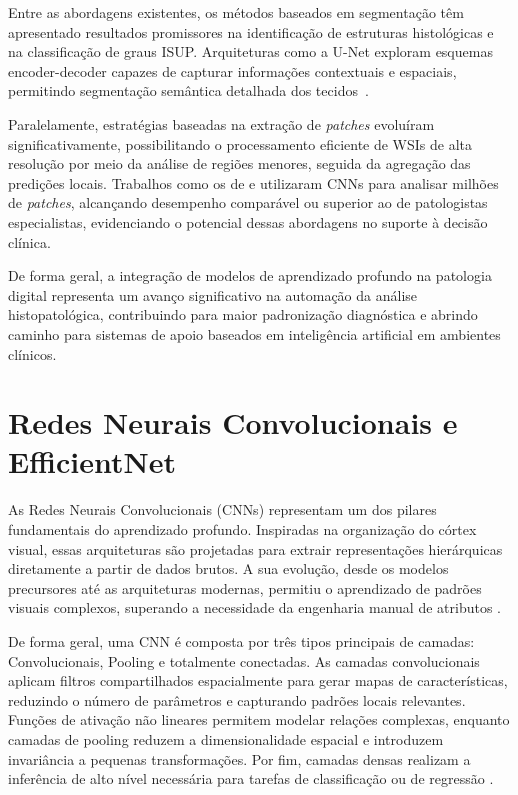 Entre as abordagens existentes, os métodos baseados em segmentação têm apresentado resultados promissores na identificação de estruturas histológicas e na classificação de graus ISUP. Arquiteturas como a U-Net exploram esquemas encoder-decoder capazes de capturar informações contextuais e espaciais, permitindo segmentação semântica detalhada dos tecidos~\cite{ref-bulten2020,ref-singhal2022}.

Paralelamente, estratégias baseadas na extração de \textit{patches} evoluíram significativamente, possibilitando o processamento eficiente de WSIs de alta resolução por meio da análise de regiões menores, seguida da agregação das predições locais. Trabalhos como os de \cite{ref-nagpal2019} e \cite{ref-kott2019} utilizaram CNNs para analisar milhões de \textit{patches}, alcançando desempenho comparável ou superior ao de patologistas especialistas, evidenciando o potencial dessas abordagens no suporte à decisão clínica.

De forma geral, a integração de modelos de aprendizado profundo na patologia digital representa um avanço significativo na automação da análise histopatológica, contribuindo para maior padronização diagnóstica e abrindo caminho para sistemas de apoio baseados em inteligência artificial em ambientes clínicos.


\section{Redes Neurais Convolucionais e EfficientNet}

As Redes Neurais Convolucionais (CNNs) representam um dos pilares fundamentais do aprendizado profundo. Inspiradas na organização do córtex visual, essas arquiteturas são projetadas para extrair representações hierárquicas diretamente a partir de dados brutos. A sua evolução, desde os modelos precursores até as arquiteturas modernas, permitiu o aprendizado de padrões visuais complexos, superando a necessidade da engenharia manual de atributos \cite{recentcnn}.

De forma geral, uma CNN é composta por três tipos principais de camadas: Convolucionais, Pooling e totalmente conectadas. As camadas convolucionais aplicam filtros compartilhados espacialmente para gerar mapas de características, reduzindo o número de parâmetros e capturando padrões locais relevantes. Funções de ativação não lineares permitem modelar relações complexas, enquanto camadas de pooling reduzem a dimensionalidade espacial e introduzem invariância a pequenas transformações. Por fim, camadas densas realizam a inferência de alto nível necessária para tarefas de classificação ou de regressão \cite{recentcnn}. 

